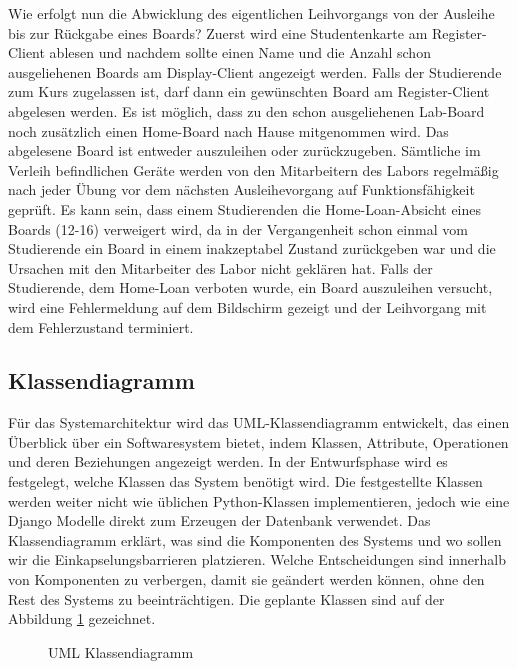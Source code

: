 Wie erfolgt nun die Abwicklung des eigentlichen Leihvorgangs von der Ausleihe bis zur Rückgabe eines Boards?  Zuerst wird eine Studentenkarte am Register-Client ablesen und nachdem sollte einen Name und die Anzahl schon ausgeliehenen Boards am Display-Client angezeigt werden. Falls der Studierende zum Kurs zugelassen ist, darf dann ein gewünschten Board am Register-Client abgelesen werden. Es ist möglich, dass zu den schon ausgeliehenen Lab-Board noch zusätzlich einen Home-Board nach Hause mitgenommen wird. Das abgelesene Board ist entweder auszuleihen oder zurückzugeben. Sämtliche im Verleih befindlichen Geräte werden von den Mitarbeitern des Labors regelmäßig nach jeder Übung vor dem nächsten Ausleihevorgang auf Funktionsfähigkeit geprüft. Es kann sein, dass einem Studierenden die Home-Loan-Absicht eines Boards (12-16) verweigert wird, da in der Vergangenheit schon einmal vom Studierende ein Board in einem inakzeptabel Zustand zurückgeben war und die Ursachen mit den Mitarbeiter des Labor nicht geklären hat. Falls der Studierende, dem Home-Loan verboten wurde, ein Board auszuleihen versucht, wird eine Fehlermeldung auf dem Bildschirm gezeigt und der Leihvorgang mit dem Fehlerzustand terminiert.  

\subsection{Klassendiagramm}
\label{sec:design:uml:class}
Für das Systemarchitektur wird das UML-Klassendiagramm entwickelt, das einen Überblick über ein Softwaresystem bietet, indem Klassen, Attribute, Operationen und deren Beziehungen angezeigt werden\cite{website:19}. In der Entwurfsphase wird es festgelegt, welche Klassen das System benötigt wird. Die festgestellte Klassen werden weiter nicht wie üblichen Python-Klassen implementieren, jedoch wie eine Django Modelle direkt zum Erzeugen der Datenbank verwendet. Das Klassendiagramm erklärt, was sind die Komponenten des Systems und wo sollen wir die Einkapselungsbarrieren platzieren. Welche Entscheidungen sind innerhalb von Komponenten zu verbergen, damit sie geändert werden können, ohne den Rest des Systems zu beeinträchtigen. Die geplante Klassen sind auf der Abbildung \ref{fig:class} gezeichnet.
\begin{figure}
	\centering
	\caption{UML Klassendiagramm}
	\label{fig:class}
\end{figure}

